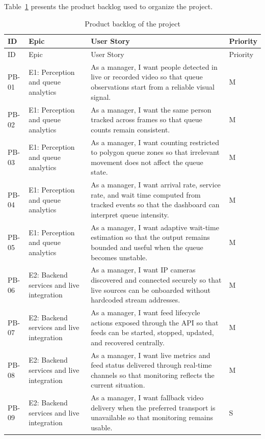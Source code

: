 Table~\ref{tab:product_backlog} presents the product backlog used to organize the project.
\begingroup\setlength{\tabcolsep}{4pt}\renewcommand{\arraystretch}{0.95}\footnotesize
\begin{longtable}{|l|p{}|p{}|l|}
    \caption{Product backlog of the project}
    \label{tab:product_backlog}\\
    \hline
    ID & Epic & User Story & Priority \\ \hline
    \endfirsthead
    \hline
    ID & Epic & User Story & Priority \\ \hline
    \endhead
    PB-01 & E1: Perception and queue analytics & As a manager, I want people detected in live or recorded video so that queue observations start from a reliable visual signal. & M \\ \hline
    PB-02 & E1: Perception and queue analytics & As a manager, I want the same person tracked across frames so that queue counts remain consistent. & M \\ \hline
    PB-03 & E1: Perception and queue analytics & As a manager, I want counting restricted to polygon queue zones so that irrelevant movement does not affect the queue state. & M \\ \hline
    PB-04 & E1: Perception and queue analytics & As a manager, I want arrival rate, service rate, and wait time computed from tracked events so that the dashboard can interpret queue intensity. & M \\ \hline
    PB-05 & E1: Perception and queue analytics & As a manager, I want adaptive wait-time estimation so that the output remains bounded and useful when the queue becomes unstable. & M \\ \hline
    PB-06 & E2: Backend services and live integration & As a manager, I want IP cameras discovered and connected securely so that live sources can be onboarded without hardcoded stream addresses. & M \\ \hline
    PB-07 & E2: Backend services and live integration & As a manager, I want feed lifecycle actions exposed through the API so that feeds can be started, stopped, updated, and recovered centrally. & M \\ \hline
    PB-08 & E2: Backend services and live integration & As a manager, I want live metrics and feed status delivered through real-time channels so that monitoring reflects the current situation. & M \\ \hline
    PB-09 & E2: Backend services and live integration & As a manager, I want fallback video delivery when the preferred transport is unavailable so that monitoring remains usable. & S \\ \hline

\end{longtable}
